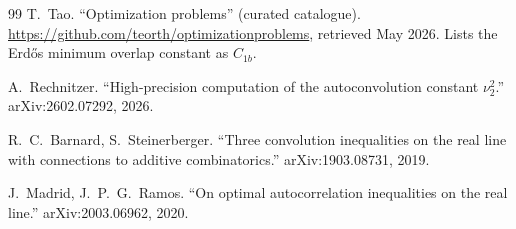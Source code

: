 \documentclass[11pt]{article}
\theoremstyle{plain}
\theoremstyle{definition}
\begin{document}
\begin{thebibliography}{99}
T.~Tao.
``Optimization problems'' (curated catalogue).
\url{https://github.com/teorth/optimizationproblems}, retrieved May
2026. Lists the Erd\H{o}s minimum overlap constant as $C_{1b}$.

A.~Rechnitzer.
``High-precision computation of the autoconvolution constant $\nu_2^2$.''
arXiv:2602.07292, 2026.

R.~C.~Barnard, S.~Steinerberger.
``Three convolution inequalities on the real line with connections to
additive combinatorics.''
arXiv:1903.08731, 2019.

J.~Madrid, J.~P.~G.~Ramos.
``On optimal autocorrelation inequalities on the real line.''
arXiv:2003.06962, 2020.

\end{thebibliography}
\end{document}
